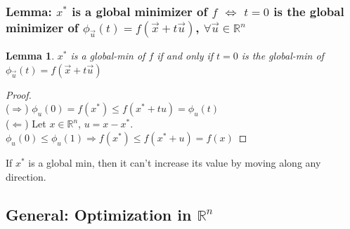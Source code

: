\documentclass[11pt,a4paper]{article}
\newtheorem{lemma}{Lemma}
\begin{document}
\subsubsection{Lemma: $x^*$ is a global minimizer of $f$ $\Leftrightarrow$ $t=0$ is the global minimizer of $\phi_{\vec{u}}(t)=f(\vec{x}+t\vec{u})$, $\forall \vec{u}\in \mathbb{R}^n$}
\begin{lemma}
    $x^*$ is a global-min of $f$ if and only if $t=0$ is the global-min of $\phi_{\vec{u}}(t)=f(\vec{x}+t\vec{u})$
\end{lemma}
\begin{proof}
\quad\\
($\Rightarrow$) $\phi_u (0)=f(x^*)\leq f(x^*+tu)=\phi_u (t)$\\
($\Leftarrow$) Let $x\in \mathbb{R}^n$, $u=x-x^*$. $\phi_u (0)\leq \phi_u (1) \Rightarrow f(x^*)\leq f(x^*+u)=f(x)$
\end{proof}
If $x^*$ is a global min, then it can't increase its value by moving along any direction.

\subsection{General: Optimization in $\mathbb{R}^n$}
\end{document}
